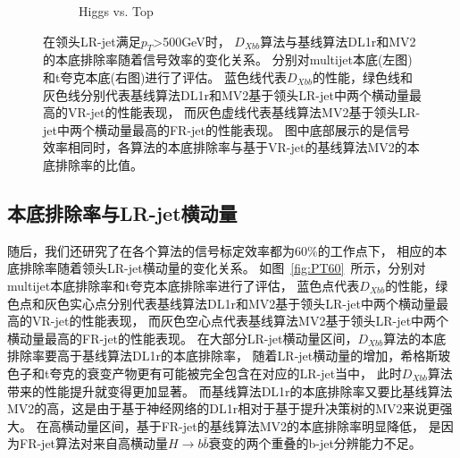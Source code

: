 \begin{figure}[!thbp]
\begin{subfigure}{.5\textwidth}
  \caption{Higgs vs. Top}
  \end{subfigure}
  \caption{
在领头LR-jet满足$p_{T}$>500GeV时，
$D_{Xbb}$算法与基线算法DL1r和MV2的本底排除率随着信号效率的变化关系。
分别对multijet本底(左图)和t夸克本底(右图)进行了评估。
蓝色线代表$D_{Xbb}$的性能，绿色线和灰色线分别代表基线算法DL1r和MV2基于领头LR-jet中两个横动量最高的VR-jet的性能表现，
而灰色虚线代表基线算法MV2基于领头LR-jet中两个横动量最高的FR-jet的性能表现。
图中底部展示的是信号效率相同时，各算法的本底排除率与基于VR-jet的基线算法MV2的本底排除率的比值。
 }
\label{fig:roc500}
\end{figure}

\subsection{本底排除率与LR-jet横动量}
\label{sec:XbbPerf5}

随后，我们还研究了在各个算法的信号标定效率都为$60\%$的工作点下，
相应的本底排除率随着领头LR-jet横动量的变化关系。
如图~\ref{fig:PT60}~所示，分别对multijet本底排除率和t夸克本底排除率进行了评估，
蓝色点代表$D_{Xbb}$的性能，绿色点和灰色实心点分别代表基线算法DL1r和MV2基于领头LR-jet中两个横动量最高的VR-jet的性能表现，
而灰色空心点代表基线算法MV2基于领头LR-jet中两个横动量最高的FR-jet的性能表现。
在大部分LR-jet横动量区间，$D_{Xbb}$算法的本底排除率要高于基线算法DL1r的本底排除率，
随着LR-jet横动量的增加，希格斯玻色子和t夸克的衰变产物更有可能被完全包含在对应的LR-jet当中，
此时$D_{Xbb}$算法带来的性能提升就变得更加显著。
而基线算法DL1r的本底排除率又要比基线算法MV2的高，这是由于基于神经网络的DL1r相对于基于提升决策树的MV2来说更强大。
在高横动量区间，基于FR-jet的基线算法MV2的本底排除率明显降低，
是因为FR-jet算法对来自高横动量$H\rightarrow b\bar{b}$衰变的两个重叠的b-jet分辨能力不足。


